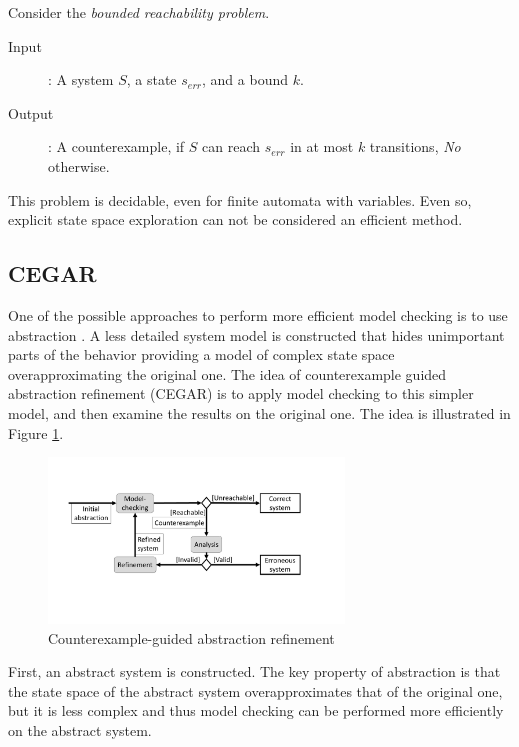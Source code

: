 Consider the \emph{bounded reachability problem}.
\begin{description}
	\item[Input]: A system $S$, a state $s_{err}$, and a bound $k$.
	\item[Output]: A counterexample, if $S$ can reach $s_{err}$ in at most $k$ transitions, \emph{No} otherwise.
\end{description}

This problem is decidable, even for finite automata with variables. Even so, explicit state space exploration can not be considered an efficient method.

\subsection{CEGAR}

One of the possible approaches to perform more efficient model checking is to use abstraction \cite{Clarke:1994:MCA}. A less detailed system model is constructed that hides unimportant parts of the behavior providing a model of complex state space overapproximating the original one. The idea of counterexample guided abstraction refinement (CEGAR) \cite{clarke2003counterexample} is to apply 
model checking to this simpler model, and then examine the results on the original one. The idea is illustrated in
Figure \ref{fig:cegar}.


\begin{figure}
	\centering
	\includegraphics [width=0.7\textwidth] {include/figures/cegar_flow_black}
	\caption{Counterexample-guided abstraction refinement}
	\label{fig:cegar}
\end{figure}


First, an abstract system is constructed. The key property of abstraction is
that the state space of the abstract system overapproximates that of the original
one, but it is less complex and thus model checking can be performed more efficiently on the abstract system.

